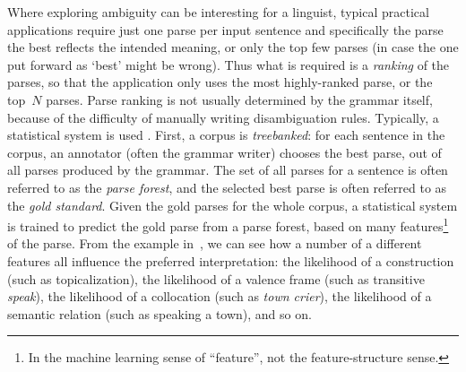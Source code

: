 \documentclass[output=paper]{langsci/langscibook}
\begin{document}
Where exploring ambiguity can be interesting for a linguist, typical practical applications require just one parse per input sentence and specifically the parse the best reflects the intended meaning, or only the top few parses (in case the one put forward as `best' might be wrong).
Thus what is required is a \textit{ranking} of the parses,
so that the application only uses the most highly-ranked parse,
or the top~$N$ parses.
Parse ranking is not usually determined by the grammar itself,
because of the difficulty of manually writing disambiguation rules.
Typically, a statistical system is used \citep{OFTM2004a-u-platte}.
First, a corpus is \textit{treebanked}:
for each sentence in the corpus,
an annotator (often the grammar writer) chooses the best parse,
out of all parses produced by the grammar.
The set of all parses for a sentence is often referred to as the \textit{parse forest},
and the selected best parse is often referred to as the \textit{gold standard}.
Given the gold parses for the whole corpus, a statistical system is trained
to predict the gold parse from a parse forest,
based on many features\footnote{%
	In the machine learning sense of ``feature'',
	not the feature-structure sense.
}
of the parse.
From the example in~,
we can see how a number of a different features all influence the preferred interpretation:
the likelihood of a construction (such as topicalization),
the likelihood of a valence frame (such as transitive \textit{speak}),
the likelihood of a collocation (such as \textit{town crier}),
the likelihood of a semantic relation (such as speaking a town),
and so on.


\end{document}
